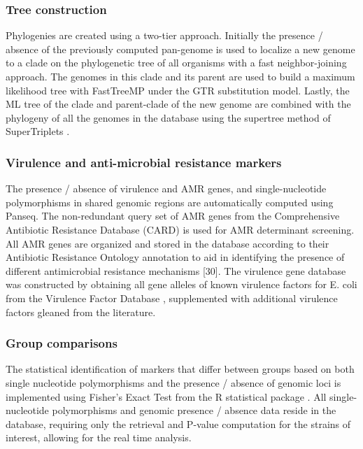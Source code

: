 \documentclass{bmcart}
\begin{document}
\subsubsection{Tree construction}
Phylogenies are created using a two-tier approach. Initially the presence / absence of the previously computed pan-genome is used to localize a new genome to a clade on the phylogenetic tree of all organisms with a fast neighbor-joining approach. The genomes in this clade and its parent are used to build a maximum likelihood tree with FastTreeMP under the GTR substitution model. Lastly, the ML tree of the clade and parent-clade of the new genome are combined with the phylogeny of all the genomes in the database using the supertree method of SuperTriplets \cite{ranwez_supertriplets:_2010}.


\subsubsection{Virulence and anti-microbial resistance markers}
The presence / absence of virulence and AMR genes, and single-nucleotide polymorphisms in shared genomic regions are automatically computed using Panseq. The non-redundant query set of AMR genes from the Comprehensive Antibiotic Resistance Database (CARD) \cite{mcarthur_comprehensive_2013} is used for AMR determinant screening. All AMR genes are organized and stored in the database according to their Antibiotic Resistance Ontology annotation to aid in identifying the presence of different antimicrobial resistance mechanisms \cite{}[30]. The virulence gene database was constructed by obtaining all gene alleles of known virulence factors for E. coli from the Virulence Factor Database \cite{chen_vfdb_2011}, supplemented with additional virulence factors gleaned from the literature. 

\subsubsection{Group comparisons}
The statistical identification of markers that differ between groups based on both single nucleotide polymorphisms and the presence / absence of genomic loci is implemented using Fisher’s Exact Test from the R statistical package \cite{r_foundation_for_statistical_computing_r:_2005}. All single-nucleotide polymorphisms and genomic presence / absence data reside in the database, requiring only the retrieval and Ρ-value computation for the strains of interest, allowing for the real time analysis.
\end{document}
